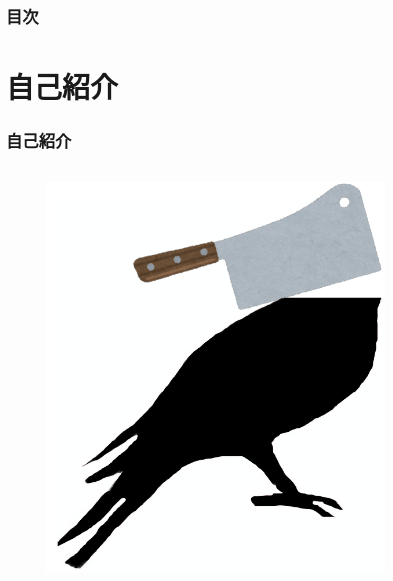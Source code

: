 \frame{\maketitle}

\begin{frame}
  \frametitle{目次}

  \tableofcontents
\end{frame}

\section{自己紹介}
\begin{frame}
  \frametitle{自己紹介}
  
  \begin{columns}
    \begin{column}{0.4\textwidth}
      \begin{center}
        \begin{figure}
          \includegraphics[width=0.8\textwidth]{img/bird2x_big_gifu.png}
        \end{figure}
      \end{center}
 

\end{column}
\end{columns}
\end{frame}
